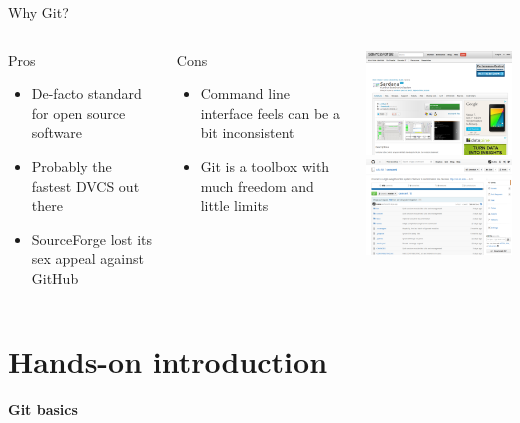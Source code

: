 \documentclass[18pt]{beamer}
\begin{document}
\begin{frame}{Why Git?}
  \begin{columns}[T,onlytextwidth]
      \begin{block}{Pros}
        \begin{itemize}
          \item De-facto standard for open source software
          \item Probably the fastest DVCS out there
          \item SourceForge lost its sex appeal against GitHub
        \end{itemize}

      \end{block}

      \begin{block}{Cons}
        \begin{itemize}
          \item Command line interface feels can be a bit inconsistent
          \item Git is a toolbox with much freedom and little limits
        \end{itemize}
      \end{block}
      \centering
      \includegraphics[width=4.0cm]{images/sf.png}
      \vspace{1em}
      \includegraphics[width=4.0cm]{images/github.png}
  \end{columns}
\end{frame}

\section{Hands-on introduction}

\begin{frame}{}
  \begin{center}
    \huge\bfseries
    \textcolor{KITblack50}{Git basics}
  \end{center}
\end{frame}
\end{document}
